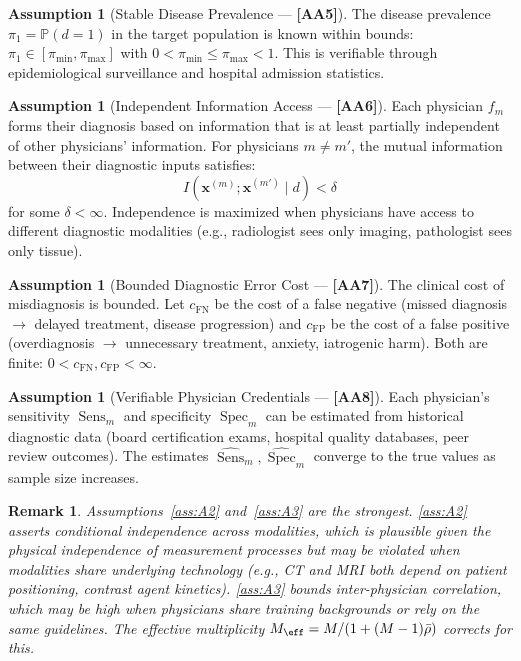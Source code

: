 \documentclass[11pt,a4paper]{article}
\newtheorem{remark}[theorem]{Remark}
\theoremstyle{definition}
\newtheorem{assumption}[theorem]{Assumption}
\DeclareMathOperator{\Sens}{Sens}
\DeclareMathOperator{\Spec}{Spec}
\newcommand{\Pbb}{\mathbb{P}}
\newcommand{\assumptionTag}[1]{\textsf{\textbf{[A#1]}}}
\newcommand{\disease}{d}                       %
\begin{document}
\begin{assumption}[Stable Disease Prevalence --- \assumptionTag{A5}]
\label{ass:A5}
The disease prevalence $\pi_1 = \Pbb(\disease = 1)$ in the target population
is known within bounds: $\pi_1 \in [\pi_{\min}, \pi_{\max}]$ with
$0 < \pi_{\min} \le \pi_{\max} < 1$. This is verifiable through epidemiological
surveillance and hospital admission statistics.
\end{assumption}

\begin{assumption}[Independent Information Access --- \assumptionTag{A6}]
\label{ass:A6}
Each physician $f_m$ forms their diagnosis based on information that is
at least partially independent of other physicians' information. For physicians
$m \neq m'$, the mutual information between their diagnostic inputs satisfies:
\begin{equation}\label{eq:A6}
    I(\mathbf{x}^{(m)}; \mathbf{x}^{(m')} \mid \disease) < \delta
\end{equation}
for some $\delta < \infty$. Independence is maximized when physicians have
access to different diagnostic modalities (e.g., radiologist sees only
imaging, pathologist sees only tissue).
\end{assumption}

\begin{assumption}[Bounded Diagnostic Error Cost --- \assumptionTag{A7}]
\label{ass:A7}
The clinical cost of misdiagnosis is bounded. Let $c_{\text{FN}}$ be the
cost of a false negative (missed diagnosis $\to$ delayed treatment, disease
progression) and $c_{\text{FP}}$ be the cost of a false positive (overdiagnosis
$\to$ unnecessary treatment, anxiety, iatrogenic harm). Both are finite:
$0 < c_{\text{FN}}, c_{\text{FP}} < \infty$.
\end{assumption}

\begin{assumption}[Verifiable Physician Credentials --- \assumptionTag{A8}]
\label{ass:A8}
Each physician's sensitivity $\Sens_m$ and specificity $\Spec_m$ can be
estimated from historical diagnostic data (board certification exams,
hospital quality databases, peer review outcomes). The estimates
$\hat{\Sens}_m, \hat{\Spec}_m$ converge to the true values as sample
size increases.
\end{assumption}

\begin{remark}
Assumptions~\ref{ass:A2} and~\ref{ass:A3} are the strongest. \ref{ass:A2}
asserts conditional independence across modalities, which is plausible
given the physical independence of measurement processes but may be violated
when modalities share underlying technology (e.g., CT and MRI both depend on
patient positioning, contrast agent kinetics). \ref{ass:A3} bounds
inter-physician correlation, which may be high when physicians share training
backgrounds or rely on the same guidelines. The effective multiplicity
$M_{\eff} = M/(1 + (M-1)\bar{\rho})$ corrects for this.
\end{remark}
\end{document}
